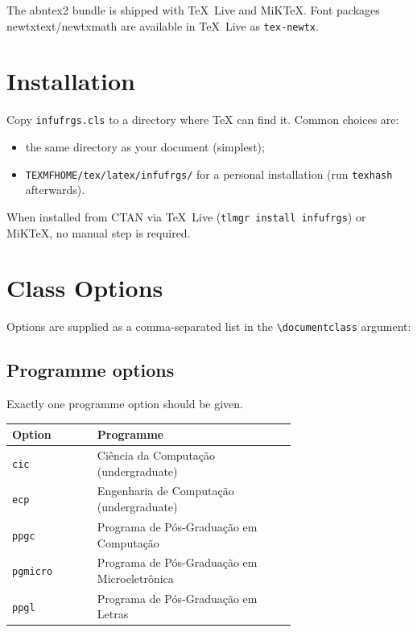 \documentclass[11pt,a4paper]{article}
\newcommand{\pkg}[1]{\textsf{#1}}
\newcommand{\opt}[1]{\texttt{#1}}
\newcommand{\cmd}[1]{\texttt{\textbackslash #1}}
\newcommand{\file}[1]{\texttt{#1}}
\begin{document}
The \pkg{abntex2} bundle is shipped with TeX~Live and MiK\TeX{}.
Font packages \pkg{newtxtext}/\pkg{newtxmath} are available in TeX~Live
as \texttt{tex-newtx}.

\section{Installation}
\label{sec:installation}

Copy \file{infufrgs.cls} to a directory where \TeX{} can find it.
Common choices are:
%
\begin{itemize}
  \item the same directory as your document (simplest);
  \item \texttt{TEXMFHOME/tex/latex/infufrgs/} for a personal
        installation (run \texttt{texhash} afterwards).
\end{itemize}
%
When installed from CTAN via TeX~Live (\texttt{tlmgr install infufrgs})
or MiK\TeX, no manual step is required.

\section{Class Options}
\label{sec:options}

Options are supplied as a comma-separated list in the
\cmd{documentclass} argument:


\subsection{Programme options}
\label{sec:progopts}

Exactly one programme option should be given.

\begin{center}
\begin{tabular}{@{}lp{0.70\linewidth}@{}}
  \toprule
  Option      & Programme \\
  \midrule
  \opt{cic}     & Ciência da Computação (undergraduate) \\
  \opt{ecp}     & Engenharia de Computação (undergraduate) \\
  \opt{ppgc}    & Programa de Pós-Graduação em Computação \\
  \opt{pgmicro} & Programa de Pós-Graduação em Microeletrônica \\
  \opt{ppgl}    & Programa de Pós-Graduação em Letras \\
  \bottomrule
\end{tabular}
\end{center}
\end{document}
